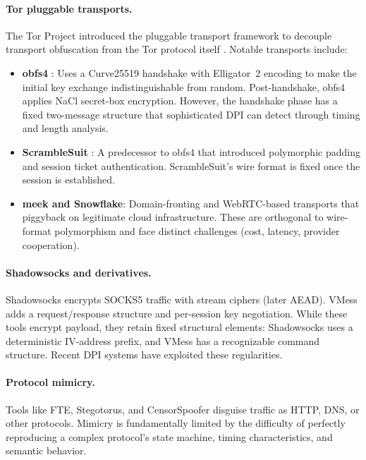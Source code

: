 \documentclass[11pt,a4paper]{article}
\let\oldparagraph\paragraph
\renewcommand{\paragraph}[1]{\needspace{5\baselineskip}\oldparagraph{#1}}
\begin{document}
\paragraph{Tor pluggable transports.} The Tor Project introduced the pluggable transport framework to decouple transport obfuscation from the Tor protocol itself \cite{dingledine2004tor}. Notable transports include:
\begin{itemize}[nosep]
  \item \textbf{obfs4} \cite{obfs4spec}: Uses a Curve25519 handshake with Elligator~2 encoding \cite{bernstein2013elligator} to make the initial key exchange indistinguishable from random. Post-handshake, obfs4 applies NaCl secret-box encryption. However, the handshake phase has a fixed two-message structure that sophisticated DPI can detect through timing and length analysis.
  \item \textbf{ScrambleSuit} \cite{winter2013scramblesuit}: A predecessor to obfs4 that introduced polymorphic padding and session ticket authentication. ScrambleSuit's wire format is fixed once the session is established.
  \item \textbf{meek and Snowflake}: Domain-fronting and WebRTC-based transports that piggyback on legitimate cloud infrastructure. These are orthogonal to wire-format polymorphism and face distinct challenges (cost, latency, provider cooperation).
\end{itemize}

\paragraph{Shadowsocks and derivatives.} Shadowsocks \cite{shadowsocks} encrypts SOCKS5 traffic with stream ciphers (later AEAD). VMess \cite{vmess} adds a request/response structure and per-session key negotiation. While these tools encrypt payload, they retain fixed structural elements: Shadowsocks uses a deterministic IV-address prefix, and VMess has a recognizable command structure. Recent DPI systems have exploited these regularities.

\paragraph{Protocol mimicry.} Tools like FTE, Stegotorus, and CensorSpoofer \cite{wang2012censorspoofer} disguise traffic as HTTP, DNS, or other protocols. Mimicry is fundamentally limited by the difficulty of perfectly reproducing a complex protocol's state machine, timing characteristics, and semantic behavior.
\end{document}
